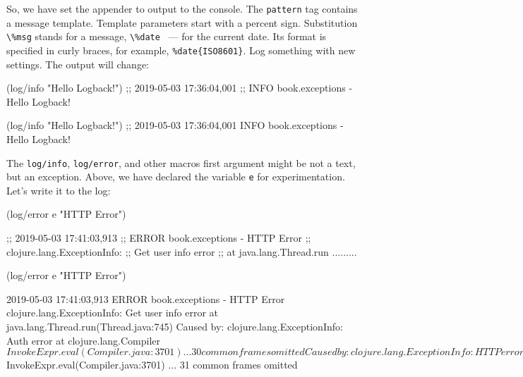 \fi


So, we have set the appender to output to the console. The \verb|pattern| tag contains a message template. Template parameters start with a percent sign. Substitution \verb|\%msg| stands for a message, \verb|\%date| ~--- for the current date. Its format is specified in curly braces, for example, \verb|%date{ISO8601}|. Log something with new settings. The output will change:

\ifx\DEVICETYPE\MOBILE

\begin{english}
  \begin{clojure}
(log/info "Hello Logback!")
;; 2019-05-03 17:36:04,001
;; INFO book.exceptions - Hello Logback!
  \end{clojure}
\end{english}

\else

\begin{english}
  \begin{clojure}
(log/info "Hello Logback!")
;; 2019-05-03 17:36:04,001 INFO book.exceptions - Hello Logback!
  \end{clojure}
\end{english}

\fi

\label{log-ex-param}

The \verb|log/info|, \verb|log/error|, and other macros first argument might be not a text, but an exception. Above, we have declared the variable \verb|e| for experimentation. Let's write it to the log:

\ifx\DEVICETYPE\MOBILE

\begin{english}
  \begin{clojure}
(log/error e "HTTP Error")

;; 2019-05-03 17:41:03,913
;; ERROR book.exceptions - HTTP Error
;; clojure.lang.ExceptionInfo:
;; Get user info error
;; at java.lang.Thread.run .........
  \end{clojure}
\end{english}

\else

\begin{english}
  \begin{clojure}
(log/error e "HTTP Error")

2019-05-03 17:41:03,913 ERROR book.exceptions - HTTP Error
clojure.lang.ExceptionInfo: Get user info error
    at java.lang.Thread.run(Thread.java:745)
Caused by: clojure.lang.ExceptionInfo: Auth error
    at clojure.lang.Compiler$InvokeExpr.eval(Compiler.java:3701)
    ... 30 common frames omitted
Caused by: clojure.lang.ExceptionInfo: HTTP error
    at clojure.lang.Compiler$InvokeExpr.eval(Compiler.java:3701)
    ... 31 common frames omitted
  \end{clojure}
\end{english}

